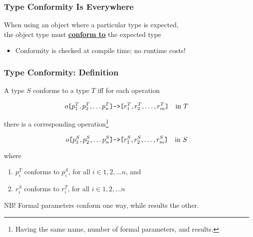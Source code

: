 \begin{frame}[fragile]

\frametitle{Type Conformity Is Everywhere}

\begin{center}

When using an object where a particular type is expected,\\ the object
type must \textbf{\underline{conform to}} the expected type

\end{center}

\begin{itemize}

\item Conformity is checked at compile time; no runtime costs!

\end{itemize}



\end{frame}


\begin{frame}[fragile]

\frametitle{Type Conformity: Definition}

\newcommand{\emlbr}{\ensuremath{\text{\texttt{[}}}}
\newcommand{\emrbr}{\ensuremath{\text{\texttt{]}}}}
\newcommand{\emrarr}{\ensuremath{\text{\texttt{->}}}}
\newcommand{\emsig}[3]{\ensuremath{#1\emlbr {#2}\emrbr\emrarr\emlbr {#3}\emrbr}}

A type $S$ conforms to a type $T$ iff for each operation

$$\emsig{o}{p^T_1, p^T_2, \ldots p^T_n}{r^T_1, r^T_2, \ldots,
r^T_m}\quad \text{in}\ T$$

there is a corresponding operation\footnote{Having the same name,
number of formal parameters, and results.}

$$\emsig{o}{p^S_1, p^S_2, \ldots p^S_n}{r^S_1, r^S_2, \ldots,
r^S_m}\quad \text{in}\ S$$

where

\begin{enumerate}

\item $p^T_i$ conforms to $p^S_i$, for all $i \in 1, 2, \ldots n$, and

\item $r^S_i$ conforms to $r^T_i$, for all $i \in 1, 2, \ldots n$

\end{enumerate}

\vspace{\fill}

\begin{center}

NB! Formal parameters conform one way, while results the other.

\end{center}

\end{frame}


